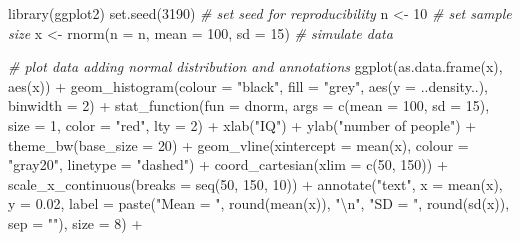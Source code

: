 \documentclass[
  oneside]{krantz}
\makeatletter
\newenvironment{Shaded}{\begin{snugshade}}{\end{snugshade}}
\newcommand{\AttributeTok}[1]{\textcolor[rgb]{0.61,0.61,0.61}{#1}}
\newcommand{\CommentTok}[1]{\textcolor[rgb]{0.37,0.37,0.37}{\textit{#1}}}
\newcommand{\DecValTok}[1]{\textcolor[rgb]{0.06,0.06,0.06}{#1}}
\newcommand{\FloatTok}[1]{\textcolor[rgb]{0.06,0.06,0.06}{#1}}
\newcommand{\FunctionTok}[1]{\textcolor[rgb]{0,0,0}{#1}}
\newcommand{\NormalTok}[1]{#1}
\newcommand{\OtherTok}[1]{\textcolor[rgb]{0.37,0.37,0.37}{#1}}
\newcommand{\SpecialCharTok}[1]{\textcolor[rgb]{0,0,0}{#1}}
\newcommand{\StringTok}[1]{\textcolor[rgb]{0.5,0.5,0.5}{#1}}
\newenvironment{kframe}{%
\medskip{}
\setlength{\fboxsep}{.8em}
 \def\at@end@of@kframe{}%
 \ifinner\ifhmode%
  \def\at@end@of@kframe{\end{minipage}}%
  \begin{minipage}{\columnwidth}%
 \fi\fi%
 \def\FrameCommand##1{\hskip\@totalleftmargin \hskip-\fboxsep
 \colorbox{shadecolor}{##1}\hskip-\fboxsep
     \hskip-\linewidth \hskip-\@totalleftmargin \hskip\columnwidth}%
 \MakeFramed {\advance\hsize-\width
   \@totalleftmargin\z@ \linewidth\hsize
   \@setminipage}}%
 {\par\unskip\endMakeFramed%
 \at@end@of@kframe}
\renewenvironment{Shaded}{\begin{kframe}}{\end{kframe}}
\makeatother
\begin{document}
\begin{Shaded}
\begin{Highlighting}[]
\FunctionTok{library}\NormalTok{(ggplot2)}
\FunctionTok{set.seed}\NormalTok{(}\DecValTok{3190}\NormalTok{) }\CommentTok{\# set seed for reproducibility}
\NormalTok{n }\OtherTok{\textless{}{-}} \DecValTok{10} \CommentTok{\# set sample size}
\NormalTok{x }\OtherTok{\textless{}{-}} \FunctionTok{rnorm}\NormalTok{(}\AttributeTok{n =}\NormalTok{ n, }\AttributeTok{mean =} \DecValTok{100}\NormalTok{, }\AttributeTok{sd =} \DecValTok{15}\NormalTok{) }\CommentTok{\# simulate data}

\CommentTok{\# plot data adding normal distribution and annotations}
\FunctionTok{ggplot}\NormalTok{(}\FunctionTok{as.data.frame}\NormalTok{(x), }\FunctionTok{aes}\NormalTok{(x)) }\SpecialCharTok{+}
  \FunctionTok{geom\_histogram}\NormalTok{(}\AttributeTok{colour =} \StringTok{"black"}\NormalTok{, }\AttributeTok{fill =} \StringTok{"grey"}\NormalTok{, }\FunctionTok{aes}\NormalTok{(}\AttributeTok{y =}\NormalTok{ ..density..), }\AttributeTok{binwidth =} \DecValTok{2}\NormalTok{) }\SpecialCharTok{+}
  \FunctionTok{stat\_function}\NormalTok{(}\AttributeTok{fun =}\NormalTok{ dnorm, }\AttributeTok{args =} \FunctionTok{c}\NormalTok{(}\AttributeTok{mean =} \DecValTok{100}\NormalTok{, }\AttributeTok{sd =} \DecValTok{15}\NormalTok{), }\AttributeTok{size =} \DecValTok{1}\NormalTok{, }\AttributeTok{color =} \StringTok{"red"}\NormalTok{, }\AttributeTok{lty =} \DecValTok{2}\NormalTok{) }\SpecialCharTok{+}
  \FunctionTok{xlab}\NormalTok{(}\StringTok{"IQ"}\NormalTok{) }\SpecialCharTok{+}
  \FunctionTok{ylab}\NormalTok{(}\StringTok{"number of people"}\NormalTok{) }\SpecialCharTok{+}
  \FunctionTok{theme\_bw}\NormalTok{(}\AttributeTok{base\_size =} \DecValTok{20}\NormalTok{) }\SpecialCharTok{+}
  \FunctionTok{geom\_vline}\NormalTok{(}\AttributeTok{xintercept =} \FunctionTok{mean}\NormalTok{(x), }\AttributeTok{colour =} \StringTok{"gray20"}\NormalTok{, }\AttributeTok{linetype =} \StringTok{"dashed"}\NormalTok{) }\SpecialCharTok{+}
  \FunctionTok{coord\_cartesian}\NormalTok{(}\AttributeTok{xlim =} \FunctionTok{c}\NormalTok{(}\DecValTok{50}\NormalTok{, }\DecValTok{150}\NormalTok{)) }\SpecialCharTok{+}
  \FunctionTok{scale\_x\_continuous}\NormalTok{(}\AttributeTok{breaks =} \FunctionTok{seq}\NormalTok{(}\DecValTok{50}\NormalTok{, }\DecValTok{150}\NormalTok{, }\DecValTok{10}\NormalTok{)) }\SpecialCharTok{+}
  \FunctionTok{annotate}\NormalTok{(}\StringTok{"text"}\NormalTok{, }\AttributeTok{x =} \FunctionTok{mean}\NormalTok{(x), }\AttributeTok{y =} \FloatTok{0.02}\NormalTok{, }\AttributeTok{label =} \FunctionTok{paste}\NormalTok{(}\StringTok{"Mean = "}\NormalTok{, }\FunctionTok{round}\NormalTok{(}\FunctionTok{mean}\NormalTok{(x)), }\StringTok{"}\SpecialCharTok{\textbackslash{}n}\StringTok{"}\NormalTok{, }\StringTok{"SD = "}\NormalTok{, }\FunctionTok{round}\NormalTok{(}\FunctionTok{sd}\NormalTok{(x)), }\AttributeTok{sep =} \StringTok{""}\NormalTok{), }\AttributeTok{size =} \DecValTok{8}\NormalTok{) }\SpecialCharTok{+} 

\end{Highlighting}
\end{Shaded}
\end{document}
